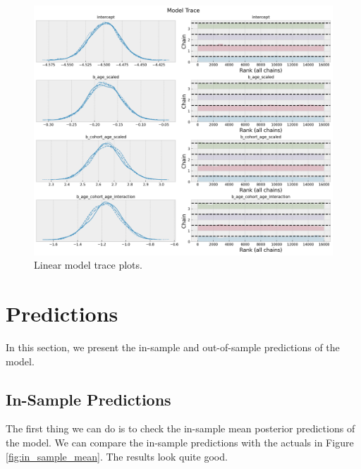 \documentclass[11pt]{amsart}
\theoremstyle{definition}
\begin{document}
\begin{figure}
    \centering
    \includegraphics[width=\textwidth]{images/revenue_retention_41_0.png}
    \caption{Linear model trace plots.}
    \label{fig:trace}
\end{figure}


\section{Predictions}

In this section, we present the in-sample and out-of-sample predictions of the model.

\subsection{In-Sample Predictions}

The first thing we can do is to check the in-sample mean posterior predictions of the
model. We can compare the in-sample predictions with the actuals in Figure
\ref{fig:in_sample_mean}. The results look quite good.
\end{document}
